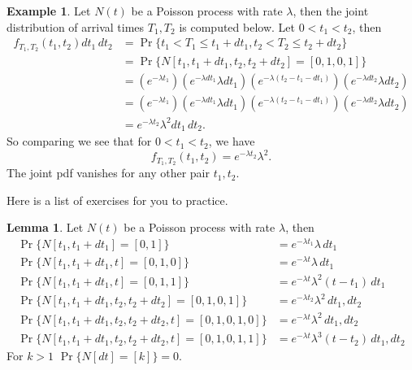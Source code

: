 \documentclass[letterpaper, 12pt]{article}
\newcommand{\1}{\mathds{1}} %
\theoremstyle{definition}
\newtheorem{lemma}[theorem]{Lemma}
\newtheorem{example}[theorem]{Example}
\begin{document}
\begin{example}
Let $N(t)$ be a Poisson process with rate $\lambda$, then the joint distribution of arrival times $T_1, T_2$ is computed below. Let $0 < t_1 < t_2$, then
\begin{align*}
f_{T_1,T_2}(t_1,t_2)dt_1\,dt_2 &= \Pr\{t_1 < T_1 \leq t_1+dt_1,t_2 < T_2 \leq t_2+dt_2\}\\
                               &= \Pr\{N[t_1,t_1+dt_1,t_2,t_2+dt_2]=[0,1,0,1]\}\\
                               &= (e^{-\lambda t_1})(e^{-\lambda dt_1}\lambda dt_1)(e^{-\lambda (t_2-t_1-dt_1)})(e^{-\lambda dt_2}\lambda dt_2)\\
                               &= (e^{-\lambda t_1})(e^{-\lambda dt_1}\lambda dt_1)(e^{-\lambda (t_2-t_1-dt_1)})(e^{-\lambda dt_2}\lambda dt_2)\\
                               &= e^{-\lambda t_2} \lambda^2 dt_1 \, dt_2.
\end{align*}
So comparing we see that for $0 < t_1 < t_2$, we have \[f_{T_1,T_2}(t_1,t_2) = e^{-\lambda t_2} \lambda^2.\]The joint pdf vanishes for any other pair $t_1,t_2$.
\end{example}

Here is a list of exercises for you to practice.

\begin{lemma}
Let $N(t)$ be a Poisson process with rate $\lambda$, then 
\begin{align*}
\Pr\{ N[t_1,t_1+dt_1]=[0,1]\} &= e^{-\lambda t_1} \lambda \, dt_1\\
\Pr\{N[t_1,t_1+dt_1,t]=[0,1,0]\} &= e^{-\lambda t} \lambda \, dt_1\\
\Pr\{N[t_1,t_1+dt_1,t]=[0,1,1]\} &= e^{-\lambda t} \lambda^2 (t-t_1)\, dt_1\\
\Pr\{N[t_1,t_1+dt_1,t_2,t_2+dt_2]=[0,1,0,1]\} &= e^{-\lambda t_2} \lambda^2 \, dt_1,dt_2\\
\Pr\{N[t_1,t_1+dt_1,t_2,t_2+dt_2,t]=[0,1,0,1,0]\} &= e^{-\lambda t} \lambda^2 \, dt_1,dt_2\\
\Pr\{N[t_1,t_1+dt_1,t_2,t_2+dt_2,t]=[0,1,0,1,1]\} &= e^{-\lambda t} \lambda^3 (t-t_2) \, dt_1,dt_2
\end{align*}
For $k > 1$ $\Pr\{N[dt]=[k]\}=0$.  
\end{lemma}
\end{document}
